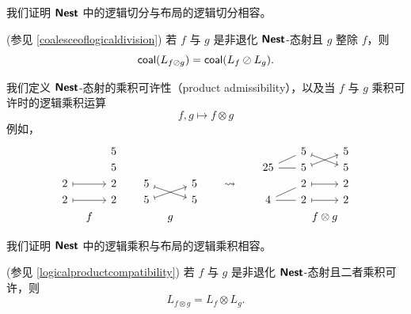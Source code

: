 我们证明 ${\boldsymbol{\mathsf{Nest}}}$ 中的逻辑切分与布局的逻辑切分相容。
\begin{mainthm}(参见 \ref{coalesceoflogicaldivision}) 若 $f$ 与 $g$ 是非退化 ${\boldsymbol{\mathsf{Nest}}}$-态射且 $g$ 整除 $f$，则
\[
\mathsf{coal}(L_{f \oslash g}) = \mathsf{coal}(L_f \oslash L_g).
\]
\end{mainthm}

我们定义 ${\boldsymbol{\mathsf{Nest}}}$-态射的乘积可许性（product admissibility），以及当 $f$ 与 $g$ 乘积可许时的逻辑乘积运算
\[
f,g \mapsto f \otimes g
\]
例如，
\[\begin{tikzcd}[row sep = 1, column sep = 8]
  & & 5 & &   & &  & &  & & & & 5 \ar[drr,mapsto] & & 5\\
  & & 5 & &   & & & & & & 25 \ar[rr,-] \ar[urr,-] & & 5 \ar[urr,mapsto] & & 5\\
2  \ar[rr,mapsto] & & 2 & & 5  \ar[drr,mapsto] & & 5 & & \rightsquigarrow & & &  & 2 \ar[rr,mapsto] & & 2\\
2 \ar[rr,mapsto] & & 2 & & 5 \ar[urr,mapsto]  & & 5 & & & & 4 \ar[rr,-] \ar[urr,-] & & 2 \ar[rr,mapsto] & & 2\\
  & f & & &  & g & & & & & & & & \mathclap{f \otimes g} &
\end{tikzcd}\]


我们证明 ${\boldsymbol{\mathsf{Nest}}}$ 中的逻辑乘积与布局的逻辑乘积相容。
\begin{mainthm}(参见 \ref{logicalproductcompatibility}) 若 $f$ 与 $g$ 是非退化 ${\boldsymbol{\mathsf{Nest}}}$-态射且二者乘积可许，则
\[
L_{f \otimes g} = L_f \otimes L_g.
\]
\end{mainthm}

